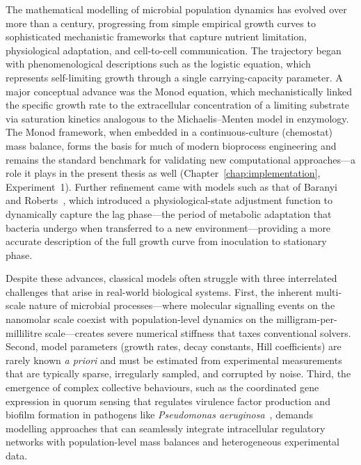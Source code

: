 \documentclass[14pt,a4paper,openany]{extbook}
\begin{document}
The mathematical modelling of microbial population dynamics has evolved over more than a century, progressing from simple empirical growth curves to sophisticated mechanistic frameworks that capture nutrient limitation, physiological adaptation, and cell-to-cell communication. The trajectory began with phenomenological descriptions such as the logistic equation, which represents self-limiting growth through a single carrying-capacity parameter. A major conceptual advance was the Monod equation, which mechanistically linked the specific growth rate to the extracellular concentration of a limiting substrate via saturation kinetics analogous to the Michaelis--Menten model in enzymology. The Monod framework, when embedded in a continuous-culture (chemostat) mass balance, forms the basis for much of modern bioprocess engineering and remains the standard benchmark for validating new computational approaches---a role it plays in the present thesis as well (Chapter~\ref{chap:implementation}, Experiment~1). Further refinement came with models such as that of Baranyi and Roberts~\cite{baranyi1994}, which introduced a physiological-state adjustment function to dynamically capture the lag phase---the period of metabolic adaptation that bacteria undergo when transferred to a new environment---providing a more accurate description of the full growth curve from inoculation to stationary phase.

Despite these advances, classical models often struggle with three interrelated challenges that arise in real-world biological systems. First, the inherent multi-scale nature of microbial processes---where molecular signalling events on the nanomolar scale coexist with population-level dynamics on the milligram-per-millilitre scale---creates severe numerical stiffness that taxes conventional solvers. Second, model parameters (growth rates, decay constants, Hill coefficients) are rarely known \textit{a priori} and must be estimated from experimental measurements that are typically sparse, irregularly sampled, and corrupted by noise. Third, the emergence of complex collective behaviours, such as the coordinated gene expression in quorum sensing that regulates virulence factor production and biofilm formation in pathogens like \textit{Pseudomonas aeruginosa}~\cite{buddrus2014analysis}, demands modelling approaches that can seamlessly integrate intracellular regulatory networks with population-level mass balances and heterogeneous experimental data.
\end{document}
